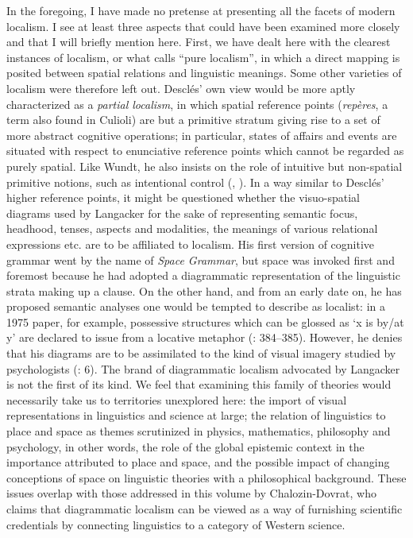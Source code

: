 \documentclass[output=paper]{langscibook}
\begin{document}
In the foregoing, I have made no pretense at presenting all the facets of modern localism. I see at least three aspects that could have been examined more closely and that I will briefly mention here. First, we have dealt here with the clearest instances of localism, or what \citet{descles_predication_1991} calls “pure localism”, in which a direct mapping is posited between spatial relations and linguistic meanings. Some other varieties of localism were therefore left out. Desclés’ own view would be more aptly characterized as a \textit{partial localism}, in which spatial reference points (\textit{repères}, a term also found in Culioli) are but a primitive stratum giving rise to a set of more abstract cognitive operations; in particular, states of affairs and events are situated with respect to enunciative reference points which cannot be regarded as purely spatial. Like Wundt, he also insists on the role of intuitive but non-spatial primitive notions, such as intentional control (\citeyear{descles_predication_1991}, \citeyear{descles_interactions_1993}). In a way similar to Desclés’ higher reference points, it might be questioned whether the visuo-spatial diagrams used by Langacker for the sake of representing semantic focus, headhood, tenses, aspects and modalities, the meanings of various relational expressions etc. are to be affiliated to localism. His first version of cognitive grammar went by the name of \textit{Space Grammar}, but space was invoked first and foremost because he had adopted a diagrammatic representation of the linguistic strata making up a clause. On the other hand, and from an early date on, he has proposed semantic analyses one would be tempted to describe as localist: in a 1975 paper, for example, possessive structures which can be glossed as ‘x is by/at y’ are declared to issue from a locative metaphor (\citeyear{langacker_functional_1975}: 384--385). However, he denies that his diagrams are to be assimilated to the kind of visual imagery studied by psychologists (\citeyear{langacker_introduction_1986}: 6). The brand of diagrammatic localism advocated by Langacker is not the first of its kind. We feel that examining this family of theories would necessarily take us to territories unexplored here: the import of visual representations in linguistics and science at large; the relation of linguistics to place and space as themes scrutinized in physics, mathematics, philosophy and psychology, in other words, the role of the global epistemic context in the importance attributed to place and space, and the possible impact of changing conceptions of space on linguistic theories with a philosophical background. These issues overlap with those addressed in this volume by Chalozin-Dovrat, who claims that diagrammatic localism can be viewed as a way of furnishing scientific credentials by connecting linguistics to a category of Western science.
\end{document}

